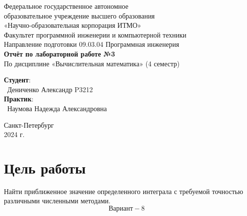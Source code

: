\documentclass{article}
\begin{document}
\begin{center}
    \Large
    Федеральное государственное автономное \\
    образовательное учреждение высшего образования \\ 
    «Научно-образовательная корпорация ИТМО»\\
    \vspace{0.5cm}
    \large
    Факультет программной инженерии и компьютерной техники \\
    Направление подготовки 09.03.04 Программная инженерия \\
    \vspace{1cm}
    \Large
    \textbf{Отчёт по лабораторной работе №3} \\
    По дисциплине «Вычислительная математика» (4 семестр)\\
    \large
    \vspace{8cm}

    \begin{minipage}{.33\textwidth}
    \end{minipage}
    \hfill
    \begin{minipage}{.4\textwidth}
    
        \textbf{Студент}: \vspace{.1cm} \\
        \ Дениченко Александр P3212\\
        \textbf{Практик}:  \\
        \ Наумова Надежда Александровна
    \end{minipage}
    \vfill
Санкт-Петербург\\ 2024 г.
\end{center}
\pagestyle{empty}
\newpage
\pagestyle{plain}
\section{Цель работы}
Найти приближенное значение определенного интеграла с требуемой точностью различными численными методами.
\[\text{Вариант} - 8\]
\end{document}
